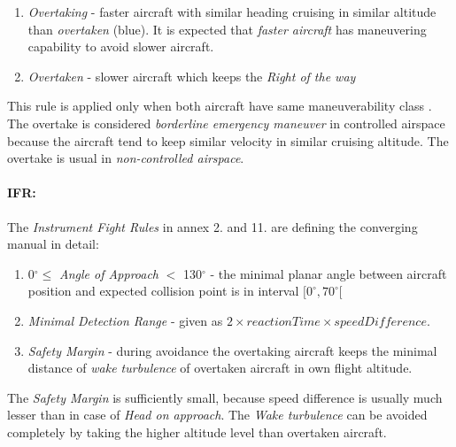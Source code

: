 \begin{enumerate}
    \item \emph{Overtaking} - faster aircraft with similar heading cruising in similar altitude than \emph{overtaken} (blue). It is expected that \emph{faster aircraft} has maneuvering capability to avoid slower aircraft.
    
    \item \emph{Overtaken} - slower aircraft which keeps the \emph{Right of the way}
\end{enumerate}

\begin{note}
    This rule is applied only when both aircraft have same maneuverability class \cite{icaoAnnex2}. The overtake is considered \emph{borderline emergency maneuver} in controlled airspace because the aircraft tend to keep similar velocity in similar cruising altitude. The overtake is usual in \emph{non-controlled airspace}.
\end{note}

\paragraph{IFR:} The \emph{Instrument Fight Rules} in annex 2. \cite{icaoAnnex2} and 11. \cite{icaoAnnex11} are defining the converging manual in detail:

\begin{enumerate}
    \item 0$^\circ \le$ \emph{Angle of Approach} $<$ 130$^\circ$ - the minimal planar angle between aircraft position and expected collision point is in interval $[0^\circ,70^\circ[$
    
    \item \emph{Minimal Detection Range} - given as $2 \times  reaction Time \times speed Difference$. 
    
    \item \emph{Safety Margin} - during avoidance the overtaking aircraft keeps the minimal distance of \emph{wake turbulence} of overtaken aircraft in own flight altitude. 
\end{enumerate}

\begin{note}
    The \emph{Safety Margin} is sufficiently small, because speed difference is usually much lesser than in case of  \emph{Head on approach}. The \emph{Wake turbulence} can be avoided completely by taking the higher altitude level than overtaken aircraft.
\end{note}


